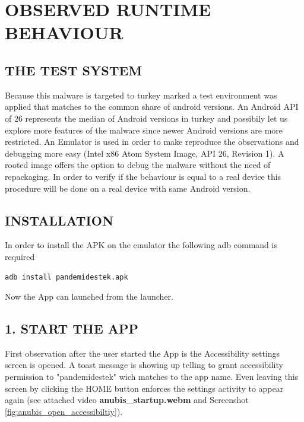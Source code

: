 \documentclass[10pt,titlepage]{article}
\begin{document}
\newpage
\section{OBSERVED RUNTIME BEHAVIOUR} \label{runtimebehaviour}

\subsection{THE TEST SYSTEM}

Because this malware is targeted to turkey marked a test environment was applied that matches to the common share of android versions. An Android API of 26 represents the median of Android versions in turkey \cite{TURKEYANDROIDVERSIONS} and possibily let us explore more features of the malware since newer Android versions are more restricted. An Emulator is used in order to make reproduce the observations and debugging more easy (Intel x86 Atom System Image, API 26, Revision 1). A rooted image offers the option to debug the malware without the need of repackaging. In order to verify if the behaviour is equal to a real device this procedure will be done on a real device with same Android version.


\subsection{INSTALLATION}
In order to install the APK on the emulator the following adb command is required

\begin{verbatim}
adb install pandemidestek.apk
\end{verbatim}

Now the App can launched from the launcher.


\subsection{1. START THE APP}
First observation after the user started the App is the Accessibility settings screen is opened. A toast message is showing up telling to grant accessibility permission to "pandemidestek" wich matches to the app name. Even leaving this screen by clicking the HOME button enforces the settings activity to appear again (see attached video \textbf{anubis\_startup.webm} and Screenshot \ref{fig:anubis_open_accessibiltiy}). 

\end{document}
